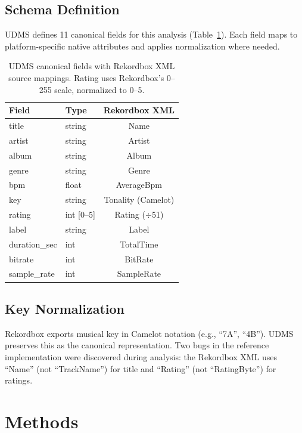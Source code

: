 \documentclass[letterpaper,10pt]{article}
\begin{document}
\subsection{Schema Definition}

UDMS defines 11 canonical fields for this analysis (Table~\ref{tab:udms-fields}). Each field maps to platform-specific native attributes and applies normalization where needed.

\begin{table}[t]
  \centering
  \small
  \begin{tabular}{llc}
    \toprule
    \textbf{Field} & \textbf{Type} & \textbf{Rekordbox XML} \\
    \midrule
    title          & string  & Name \\
    artist         & string  & Artist \\
    album          & string  & Album \\
    genre          & string  & Genre \\
    bpm            & float   & AverageBpm \\
    key            & string  & Tonality (Camelot) \\
    rating         & int [0--5] & Rating ($\div$51) \\
    label          & string  & Label \\
    duration\_sec  & int     & TotalTime \\
    bitrate        & int     & BitRate \\
    sample\_rate   & int     & SampleRate \\
    \bottomrule
  \end{tabular}
  \caption{UDMS canonical fields with Rekordbox XML source mappings. Rating uses Rekordbox's 0--255 scale, normalized to 0--5.}
  \label{tab:udms-fields}
\end{table}

\subsection{Key Normalization}

Rekordbox exports musical key in Camelot notation (e.g., ``7A'', ``4B''). UDMS preserves this as the canonical representation. Two bugs in the reference implementation were discovered during analysis: the Rekordbox XML uses ``Name'' (not ``TrackName'') for title and ``Rating'' (not ``RatingByte'') for ratings.

\section{Methods}
\end{document}
